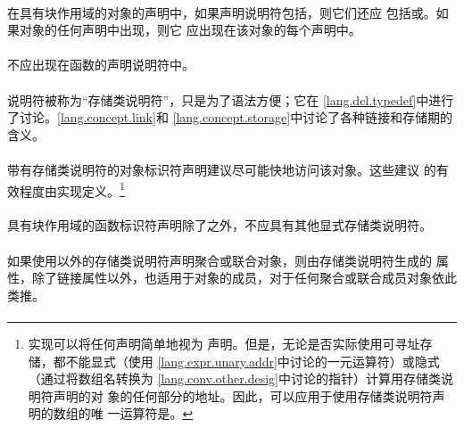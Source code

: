 {\paragraph{}
在具有块作用域的对象的声明中，如果声明说明符包括，则它们还应
包括或。如果对象的任何声明中出现，则它
应出现在该对象的每个声明中。

\paragraph{}
不应出现在函数的声明说明符中。

\semantic
\paragraph{}
说明符被称为``存储类说明符''，只是为了语法方便；它在
\ref{lang.dcl.typedef}中进行了讨论。\ref{lang.concept.link}和
\ref{lang.concept.storage}中讨论了各种链接和存储期的含义。

\paragraph{}
带有存储类说明符的对象标识符声明建议尽可能快地访问该对象。这些建议
的有效程度由实现定义。\footnote{实现可以将任何声明简单地视为
声明。但是，无论是否实际使用可寻址存储，都不能显式（使用
\ref{lang.expr.unary.addr}中讨论的一元运算符）或隐式（通过将数组名转换为
\ref{lang.conv.other.desig}中讨论的指针）计算用存储类说明符声明的对
象的任何部分的地址。因此，可以应用于使用存储类说明符声明的数组的唯
一运算符是。}

\paragraph{}
具有块作用域的函数标识符声明除了之外，不应具有其他显式存储类说明符。

\paragraph{}
如果使用以外的存储类说明符声明聚合或联合对象，则由存储类说明符生成的
属性，除了链接属性以外，也适用于对象的成员，对于任何聚合或联合成员对象依此类推。


\syntax
\paragraph{}

}
